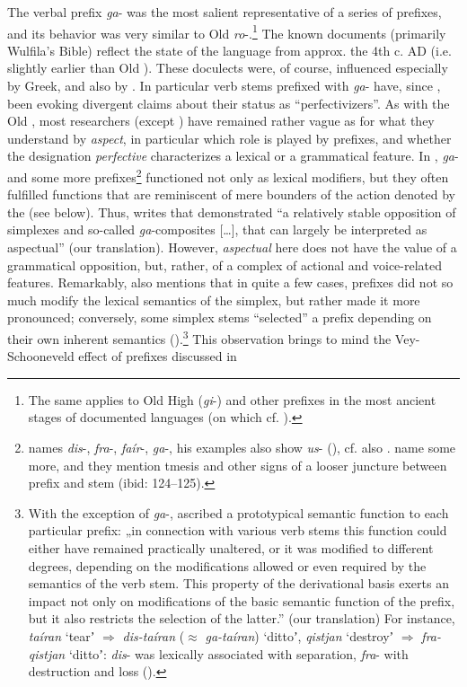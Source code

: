 \documentclass[output=paper]{langsci/langscibook}
\begin{document}
The  verbal prefix \textit{ga}- was the most salient representative of a series of prefixes, and its behavior was very similar to Old  \textit{ro}-.\footnote{The same applies to Old High  (\textit{gi}-) and other prefixes in the most ancient stages of documented  languages (on which cf. \citealt[297, 397]{Kotin2012}).} The known documents (primarily Wulfila’s Bible) reflect the state of the language from approx. the 4th c. AD (i.e. slightly earlier than Old ). These doculects were, of course, influenced especially by Greek, and also by  \citep[21]{Kotin2012}. In particular verb stems prefixed with \textit{ga}- have, since \citet{Streitberg1891}, been evoking divergent claims about their status as “perfectivizers”. As with the Old  , most researchers (except \citealt{Maslov1959}) have remained rather vague as for what they understand by \textit{aspect}, in particular which role is played by prefixes, and whether the designation \textit{perfective} characterizes a lexical or a grammatical feature. In , \textit{ga}- and some more prefixes\footnote{\citet[393f.]{Kotin2012} names \textit{dis}-, \textit{fra}-, \textit{faír}-, \textit{ga}-, his examples also show \textit{us}- (\citeyear[397]{Kotin2012}), cf. also \citet[205--209]{Guxman1998}. \citet[124]{Braune1961} name some more, and they mention tmesis and other signs of a looser juncture between prefix and stem (ibid: 124–125).} functioned not only as lexical modifiers, but they often fulfilled functions that are reminiscent of mere bounders of the action denoted by the  (see below). Thus, \citet[287]{Kotin2012} writes that  demonstrated “a relatively stable opposition of simplexes and so-called \textit{ga}-composites […], that can largely be interpreted as aspectual” (our translation). However, \textit{aspectual} here does not have the value of a grammatical opposition, but, rather, of a complex of actional and voice-related features. Remarkably, \citeauthor{Kotin2012} also mentions that in quite a few cases, prefixes did not so much modify the lexical semantics of the simplex, but rather made it more pronounced; conversely, some simplex stems “selected” a prefix depending on their own inherent semantics (\citeyear[394–395]{Kotin2012}).\footnote{With the exception of \textit{ga}-, \citet[394]{Kotin2012} ascribed a prototypical semantic function to each particular prefix: „in connection with various verb stems this function could either have remained practically unaltered, or it was modified to different degrees, depending on the modifications allowed or even required by the semantics of the verb stem. This property of the derivational basis exerts an impact not only on modifications of the basic semantic function of the prefix, but it also restricts the selection of the latter.” (our translation) For instance, \textit{taíran} ‘tearʼ ${\Rightarrow}$ \textit{dis-taíran} (${\approx}$ \textit{ga-taíran}) ‘dittoʼ, \textit{qistjan} ‘destroyʼ ${\Rightarrow}$ \textit{fra-qistjan} ‘dittoʼ: \textit{dis}- was lexically associated with separation, \textit{fra}- with destruction and loss (\citeyear[394–395]{Kotin2012}).} This observation brings to mind the Vey-Schooneveld effect of prefixes discussed in 
\end{document}
